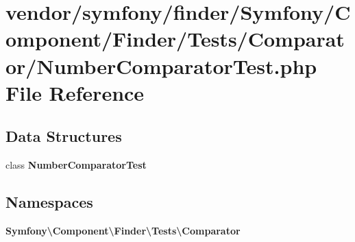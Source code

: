 \section{vendor/symfony/finder/\+Symfony/\+Component/\+Finder/\+Tests/\+Comparator/\+Number\+Comparator\+Test.php File Reference}
\label{_number_comparator_test_8php}
\subsection*{Data Structures}
\begin{DoxyCompactItemize}
\item 
class {\bf Number\+Comparator\+Test}
\end{DoxyCompactItemize}
\subsection*{Namespaces}
\begin{DoxyCompactItemize}
\item 
 {\bf Symfony\textbackslash{}\+Component\textbackslash{}\+Finder\textbackslash{}\+Tests\textbackslash{}\+Comparator}
\end{DoxyCompactItemize}
